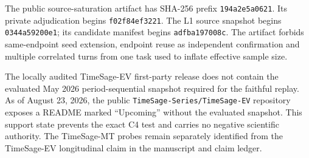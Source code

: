 The public source-saturation artifact has SHA-256 prefix \texttt{194a2e5a0621}. Its private adjudication begins \texttt{f02f84ef3221}. The L1 source snapshot begins \texttt{0344a59200e1}; its candidate manifest begins \texttt{adfba197008c}. The artifact forbids same-endpoint seed extension, endpoint reuse as independent confirmation and multiple correlated turns from one task used to inflate effective sample size.

The locally audited TimeSage-EV first-party release does not contain the evaluated May 2026 period-sequential snapshot required for the faithful replay. As of August 23, 2026, the public \texttt{TimeSage-Series/TimeSage-EV} repository exposes a README marked ``Upcoming'' without the evaluated snapshot. This support state prevents the exact C4 test and carries no negative scientific authority. The TimeSage-MT probes remain separately identified from the TimeSage-EV longitudinal claim in the manuscript and claim ledger.
